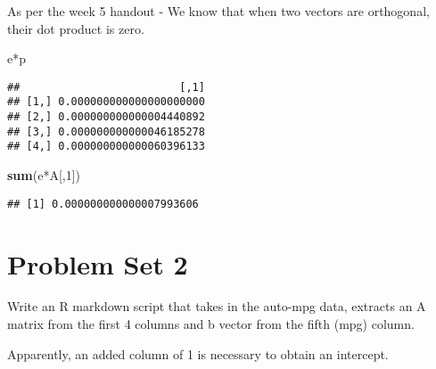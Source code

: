 \documentclass[]{article}
\newenvironment{Shaded}{\begin{snugshade}}{\end{snugshade}}
\newcommand{\KeywordTok}[1]{\textcolor[rgb]{0.13,0.29,0.53}{\textbf{{#1}}}}
\newcommand{\DecValTok}[1]{\textcolor[rgb]{0.00,0.00,0.81}{{#1}}}
\newcommand{\StringTok}[1]{\textcolor[rgb]{0.31,0.60,0.02}{{#1}}}
\newcommand{\NormalTok}[1]{{#1}}
\begin{document}
As per the week 5 handout - We know that when two vectors are
orthogonal, their dot product is zero.

\begin{Shaded}
\begin{Highlighting}[]
\NormalTok{e*p}
\end{Highlighting}
\end{Shaded}

\begin{verbatim}
##                         [,1]
## [1,] 0.000000000000000000000
## [2,] 0.000000000000004440892
## [3,] 0.000000000000046185278
## [4,] 0.000000000000060396133
\end{verbatim}

\begin{Shaded}
\begin{Highlighting}[]
\KeywordTok{sum}\NormalTok{(e*A[,}\DecValTok{1}\NormalTok{])}
\end{Highlighting}
\end{Shaded}

\begin{verbatim}
## [1] 0.000000000000007993606
\end{verbatim}

\newpage

\section{Problem Set 2}\label{problem-set-2}

Write an R markdown script that takes in the auto-mpg data, extracts an
A matrix from the first 4 columns and b vector from the fifth (mpg)
column.

Apparently, an added column of 1 is necessary to obtain an intercept.

\begin{Shaded}
\end{Shaded}
\end{document}

